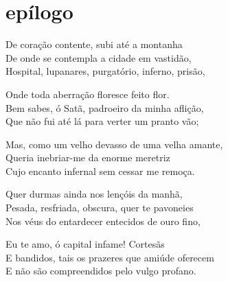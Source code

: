 \quebra\section[Epílogo]{epílogo}

\bigskip

\noindent De coração contente, subi até a montanha\\
De onde se contempla a cidade em vastidão,\\
Hospital, lupanares, purgatório, inferno, prisão,\\\medskip

\noindent Onde toda aberração floresce feito flor.\\
Bem sabes, ó Satã, padroeiro da minha aflição,\\
Que não fui até lá para verter um pranto vão;\\\medskip

\noindent Mas, como um velho devasso de uma velha amante,\\
Queria inebriar-me da enorme meretriz\\
Cujo encanto infernal sem cessar me remoça.\\\medskip

\noindent Quer durmas ainda nos lençóis da manhã,\\
Pesada, resfriada, obscura, quer te pavoneies\\ 
Nos véus do entardecer entecidos de ouro fino,\\\medskip

\noindent Eu te amo, ó capital infame! Cortesãs\\
E bandidos, tais os prazeres que amiúde oferecem\\
E não são compreendidos pelo vulgo profano.\\
\vfil


